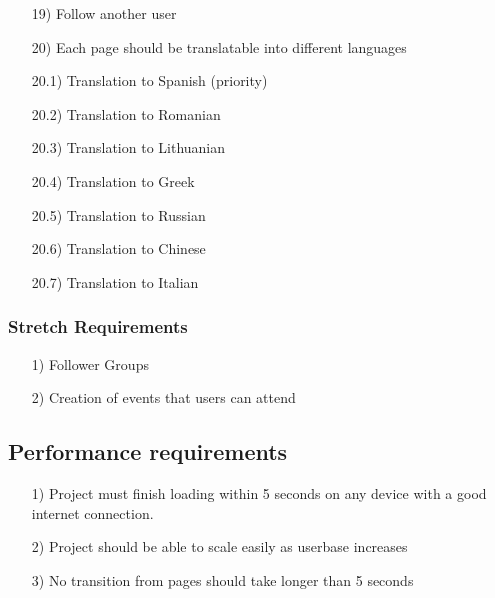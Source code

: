 \documentclass[10pt,a4paper]{article}
\begin{document}
\begin{itemize}
\item[19)]
Follow another user

\item[20)]
Each page should be translatable into different languages

\item[20.1)]
Translation to Spanish (priority)

\item[20.2)]
Translation to Romanian

\item[20.3)]
Translation to Lithuanian

\item[20.4)]
Translation to Greek

\item[20.5)]
Translation to Russian

\item[20.6)]
Translation to Chinese

\item[20.7)]
Translation to Italian


\end{itemize}

\subsubsection{Stretch Requirements}

\begin{itemize}

\item[1)]
Follower Groups

\item[2)]
Creation of events that users can attend

\end{itemize}

\subsection{Performance requirements}

\begin{itemize}

\item[1)]
Project must finish loading within 5 seconds on any device with a good internet connection.

\item[2)]
Project should be able to scale easily as userbase increases

\item[3)]
No transition from pages should take longer than 5 seconds

\end{itemize}
\end{document}
